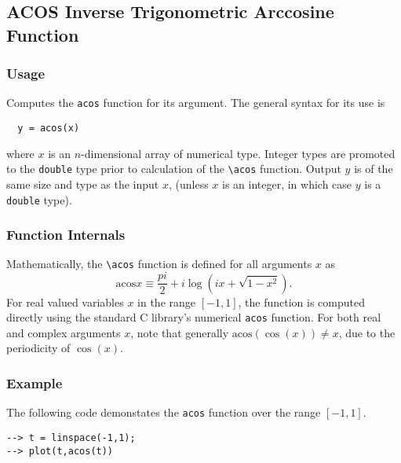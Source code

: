 %
%
%
\subsection{ACOS Inverse Trigonometric Arccosine Function}
\subsubsection{Usage}
Computes the \verb|acos| function for its argument.  The general
syntax for its use is
\begin{verbatim}
  y = acos(x)
\end{verbatim}
where $x$ is an $n$-dimensional array of numerical type.
Integer types are promoted to the \verb|double| type prior to
calculation of the \verb|\acos| function.  Output $y$ is of the
same size and type as the input $x$, (unless $x$ is an
integer, in which case $y$ is a \verb|double| type).  
\subsubsection{Function Internals}
Mathematically, the \verb|\acos| function is defined for all 
arguments $x$ as
\[
 \mathrm{acos} x \equiv \frac{pi}{2} + i \log \left(i x + 
  \sqrt{1-x^2}\right).
\]
For real valued variables $x$ in the range $[-1,1]$, the function is
computed directly using the standard C library's numerical \verb|acos|
function. For both real and complex arguments $x$, note that generally
$\mathrm{acos}(\cos(x)) \neq x$, due to the periodicity of $\cos(x)$.
\subsubsection{Example}
The following code demonstates the \verb|acos| function over the range 
$[-1,1]$.
\begin{verbatim}
--> t = linspace(-1,1);
--> plot(t,acos(t))
\end{verbatim}
